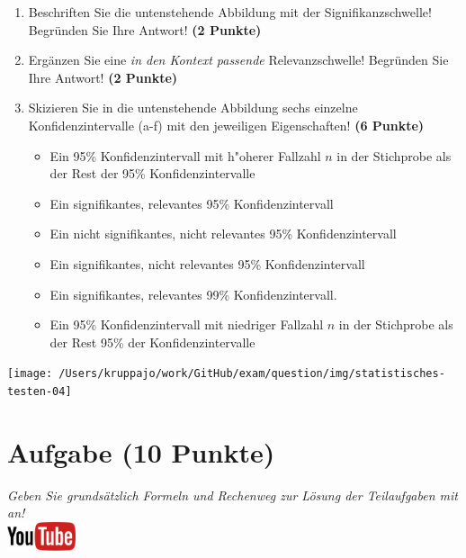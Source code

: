 \documentclass[a4paper, 9pt]{scrartcl}\usepackage[]{graphicx}\usepackage[]{xcolor}
\begin{document}
\begin{enumerate}
\item Beschriften Sie die untenstehende Abbildung mit der
  Signifikanzschwelle! Begr{\"u}nden Sie Ihre Antwort! \textbf{(2 Punkte)}
\item Erg{\"a}nzen Sie eine \textit{in den Kontext passende} Relevanzschwelle!
  Begr{\"u}nden Sie Ihre Antwort! \textbf{(2 Punkte)} 
\item Skizieren Sie in die
  untenstehende Abbildung sechs einzelne Konfidenzintervalle (a-f) mit den
  jeweiligen Eigenschaften! \textbf{(6 Punkte)}
  \begin{itemize}
  \item[(a)] Ein 95\% Konfidenzintervall mit h{"o}herer Fallzahl $n$ in der Stichprobe als der Rest der 95\% Konfidenzintervalle 	
  \item[(b)] Ein signifikantes, relevantes 95\% Konfidenzintervall 	
  \item[(c)] Ein nicht signifikantes, nicht relevantes 95\% Konfidenzintervall 	
  \item[(d)] Ein signifikantes, nicht relevantes 95\% Konfidenzintervall 
  \item[(e)] Ein signifikantes, relevantes 99\% Konfidenzintervall.
  \item[(f)] Ein 95\% Konfidenzintervall mit niedriger Fallzahl $n$ in der Stichprobe als der Rest 95\% der Konfidenzintervalle
  \end{itemize}
\end{enumerate}

\begin{center}
  \texttt{[image: /Users/kruppajo/work/GitHub/exam/question/img/statistisches-testen-04]}
\end{center}


 
\clearpage

\section{Aufgabe \hfill (10 Punkte)}

\textit{Geben Sie grunds{\"a}tzlich Formeln und Rechenweg zur L{\"o}sung der
  Teilaufgaben mit an!} \\[1Ex]

\hfill\href{https://youtu.be/FgZmpnEWDag}{\includegraphics[width =
  2cm]{img/youtube}}\\[1Ex]
\end{document}
